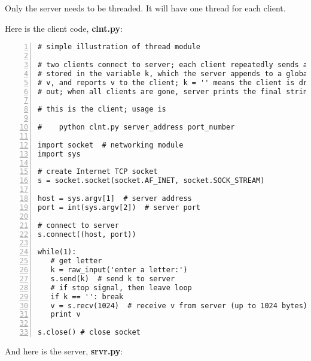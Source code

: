 Only the server needs to be threaded.  It will have one thread for each
client.

Here is the client code, {\bf clnt.py}:

\begin{Verbatim}[fontsize=\relsize{-2},numbers=left]
# simple illustration of thread module

# two clients connect to server; each client repeatedly sends a letter,
# stored in the variable k, which the server appends to a global string
# v, and reports v to the client; k = '' means the client is dropping
# out; when all clients are gone, server prints the final string v

# this is the client; usage is

#    python clnt.py server_address port_number

import socket  # networking module
import sys

# create Internet TCP socket
s = socket.socket(socket.AF_INET, socket.SOCK_STREAM)

host = sys.argv[1]  # server address
port = int(sys.argv[2])  # server port

# connect to server
s.connect((host, port))

while(1):
   # get letter
   k = raw_input('enter a letter:')
   s.send(k)  # send k to server
   # if stop signal, then leave loop
   if k == '': break
   v = s.recv(1024)  # receive v from server (up to 1024 bytes)
   print v  

s.close() # close socket
\end{Verbatim}

And here is the server, {\bf srvr.py}:

